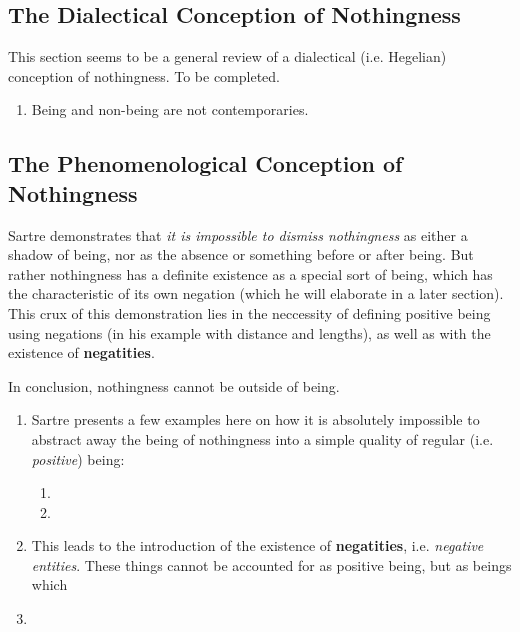 \subsection{The Dialectical Conception of Nothingness}
This section seems to be a general review of a dialectical (i.e. Hegelian) conception of nothingness. To be completed.

\begin{enumerate}
  \item Being and non-being are not contemporaries.
\end{enumerate}

\subsection{The Phenomenological Conception of Nothingness}

Sartre demonstrates that \emph{it is impossible to dismiss nothingness} as either a shadow of being, nor as the absence or something before or after being. But rather nothingness has a definite existence as a special sort of being, which has the characteristic of its own negation (which he will elaborate in a later section). This crux of this demonstration lies in the neccessity of defining positive being using negations (in his example with distance and lengths), as well as with the existence of \textbf{negatities}.

\noindent
In conclusion, nothingness cannot be outside of being.

\begin{enumerate}
  \item Sartre presents a few examples here on how it is absolutely impossible to abstract away the being of nothingness into a simple quality of regular (i.e. \emph{positive}) being:
  \begin{enumerate}
    \item {}
    \item {}
  \end{enumerate}
  \item This leads to the introduction of the existence of \textbf{negatities}, i.e. \emph{negative entities}. These things cannot be accounted for as positive being, but as beings which 
  \item {}
\end{enumerate}

